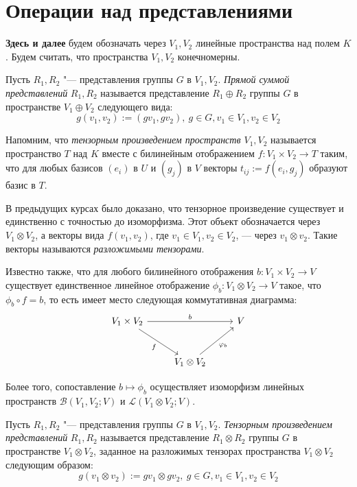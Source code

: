 \section{Операции над представлениями}

\textbf{Здесь и далее} будем обозначать через $V_1, V_2$ линейные пространства над полем $K$. Будем считать, что пространства $V_1, V_2$ конечномерны.

\begin{definition}
	Пусть $R_1, R_2$ "--- представления группы $G$ в $V_1, V_2$. \textit{Прямой суммой представлений} $R_1, R_2$ называется представление $R_1 \oplus R_2$ группы $G$ в пространстве $V_1 \oplus V_2$ следующего вида:
	\[g(v_1, v_2) := (gv_1, gv_2),~g \in G, v_1 \in V_1, v_2 \in V_2\]
\end{definition}

\begin{note}
	Напомним, что \textit{тензорным произведением пространств $V_1, V_2$} называется пространство $T$ над $K$ вместе с билинейным отображением $f: V_1 \times V_2 \to T$ таким, что для любых базисов $(e_i)$ в $U$ и $(g_j)$ в $V$ векторы $t_{ij} := f({e_i}, {g_j})$ образуют базис в $T$.
	
	В предыдущих курсах было доказано, что тензорное произведение существует и единственно с точностью до изоморфизма. Этот объект обозначается через $V_1 \otimes V_2$, а векторы вида $f(v_1, v_2)$, где $v_1 \in V_1, v_2 \in V_2$, --- через $v_1 \otimes v_2$. Такие векторы называются \textit{разложимыми тензорами}.
	
	Известно также, что для любого билинейного отображения $b: V_1 \times V_2 \rightarrow V$ существует единственное линейное отображение $\phi_b: V_1 \otimes V_2 \rightarrow V$ такое, что $\phi_b \circ f = b$, то есть имеет место следующая коммутативная диаграмма:
	\[
	\begin{tikzcd}[row sep = large]
		V_1 \arrow[swap]{dr}{f} \times V_2 \arrow[]{rr}{b} && V\\
		& V_1 \otimes V_2 \arrow[swap]{ur}{\phi_b}&
	\end{tikzcd}
	\]
	
	Более того, сопоставление $b \mapsto \phi_b$ осуществляет изоморфизм линейных пространств $\mathcal{B}(V_1, V_2; V)$ и $\mathcal{L}(V_1 \otimes V_2; V)$.
\end{note}

\begin{definition}
	Пусть $R_1, R_2$ "--- представления группы $G$ в $V_1, V_2$. \textit{Тензорным произведением представлений} $R_1, R_2$ называется представление $R_1 \otimes R_2$ группы $G$ в пространстве $V_1 \otimes V_2$, заданное на разложимых тензорах пространства $V_1 \otimes V_2$ следующим образом:
	\[g(v_1 \otimes v_2) := gv_1 \otimes gv_2,~g \in G, v_1 \in V_1, v_2 \in V_2\]
\end{definition}

